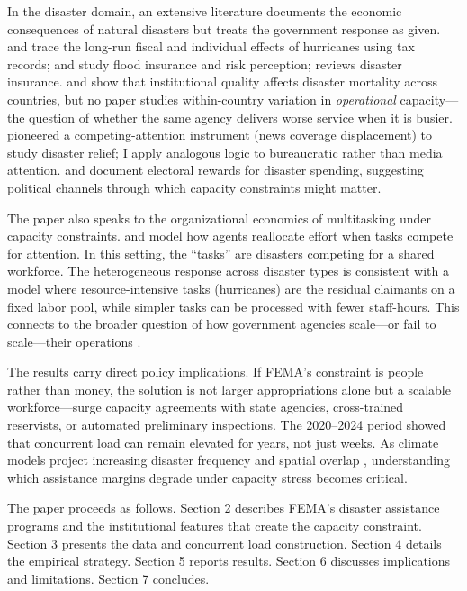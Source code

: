 \documentclass[12pt]{article}
\begin{document}
In the disaster domain, an extensive literature documents the economic consequences of natural disasters \citep{strobl2011, boustan2020, noy2009} but treats the government response as given. \citet{deryugina2017} and \citet{deryugina2018} trace the long-run fiscal and individual effects of hurricanes using tax records; \citet{gallagher2014} and \citet{gallagher2017} study flood insurance and risk perception; \citet{kousky2018} reviews disaster insurance. \citet{anbarci2005} and \citet{kahn2005} show that institutional quality affects disaster mortality across countries, but no paper studies within-country variation in \textit{operational} capacity---the question of whether the same agency delivers worse service when it is busier. \citet{eisensee2007} pioneered a competing-attention instrument (news coverage displacement) to study disaster relief; I apply analogous logic to bureaucratic rather than media attention. \citet{healy2009} and \citet{gasper2007} document electoral rewards for disaster spending, suggesting political channels through which capacity constraints might matter.

The paper also speaks to the organizational economics of multitasking under capacity constraints. \citet{holmstrom1991} and \citet{dewatripont2005} model how agents reallocate effort when tasks compete for attention. In this setting, the ``tasks'' are disasters competing for a shared workforce. The heterogeneous response across disaster types is consistent with a model where resource-intensive tasks (hurricanes) are the residual claimants on a fixed labor pool, while simpler tasks can be processed with fewer staff-hours. This connects to the broader question of how government agencies scale---or fail to scale---their operations \citep{chetty2014, baicker2012}.

The results carry direct policy implications. If FEMA's constraint is people rather than money, the solution is not larger appropriations alone but a scalable workforce---surge capacity agreements with state agencies, cross-trained reservists, or automated preliminary inspections. The 2020--2024 period showed that concurrent load can remain elevated for years, not just weeks. As climate models project increasing disaster frequency and spatial overlap \citep{diffenbaugh2017, coronese2019, bakkensen2017}, understanding which assistance margins degrade under capacity stress becomes critical.

The paper proceeds as follows. Section 2 describes FEMA's disaster assistance programs and the institutional features that create the capacity constraint. Section 3 presents the data and concurrent load construction. Section 4 details the empirical strategy. Section 5 reports results. Section 6 discusses implications and limitations. Section 7 concludes.
\end{document}
